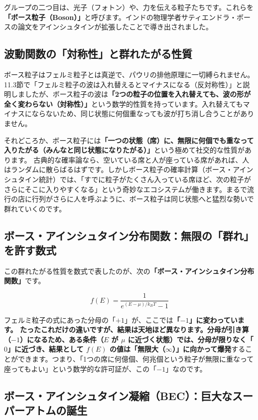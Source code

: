 グループの二つ目は、光子（フォトン）や、力を伝える粒子たちです。これらを\textbf{「ボース粒子（Boson）」}と呼びます。インドの物理学者サティエンドラ・ボースの論文をアインシュタインが拡張したことで導き出されました。

\subsection{波動関数の「対称性」と群れたがる性質}

ボース粒子はフェルミ粒子とは真逆で、パウリの排他原理に一切縛られません。 11.3節で「フェルミ粒子の波は入れ替えるとマイナスになる（反対称性）」と説明しましたが、ボース粒子の波は\textbf{「2つの粒子の位置を入れ替えても、波の形が全く変わらない（対称性）」}という数学的性質を持っています。入れ替えてもマイナスにならないため、同じ状態に何個重なっても波が打ち消し合うことがありません。

それどころか、ボース粒子には\textbf{「一つの状態（席）に、無限に何個でも重なって入りたがる（みんなと同じ状態になりたがる）」}という極めて社交的な性質があります。 古典的な確率論なら、空いている席と人が座っている席があれば、人はランダムに散らばるはずです。しかしボース粒子の確率計算（ボース・アインシュタイン統計）では、「すでに粒子がたくさん入っている席ほど、次の粒子がさらにそこに入りやすくなる」という奇妙なエコシステムが働きます。まるで流行の店に行列がさらに人を呼ぶように、ボース粒子は同じ状態へと猛烈な勢いで群れていくのです。

\subsection{ボース・アインシュタイン分布関数：無限の「群れ」を許す数式}

この群れたがる性質を数式で表したのが、次の\textbf{「ボース・アインシュタイン分布関数」}です。

\[
f(E) = \frac{1}{e^{(E-\mu)/k_B T}-1}
\]

フェルミ粒子の式にあった分母の「\(+1\)」が、ここでは\textbf{「\(-1\)」に変わっています。 たったこれだけの違いですが、結果は天地ほど異なります。分母が引き算（\(-1\)）になるため、ある条件（\(E\) が \(\mu\) に近づく状態）では、分母が限りなく「\(0\)」に近づき、結果として \(f(E)\) の値は「無限大（\(\infty\)）」に向かって爆発}することができます。つまり、「1つの席に何億個、何兆個という粒子が無限に重なって座ってもよい」という数学的な許可証が、この「\(-1\)」なのです。

\subsection{ボース・アインシュタイン凝縮（BEC）：巨大なスーパーアトムの誕生}

